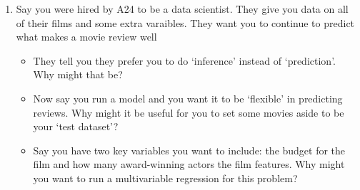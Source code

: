 \documentclass[12pt]{article}
\begin{document}
\begin{enumerate}
  \item Say you were hired by A24 to be a data scientist. They give you data on all of their films and some extra varaibles. They want you to continue to predict what makes a movie review well
  \begin{itemize}
    \item They tell you they prefer you to do `inference' instead of `prediction'. Why might that be?
    
    \item Now say you run a model and you want it to be `flexible' in predicting reviews. Why might it be useful for you to set some movies aside to be your `test dataset'?
    
    \item Say you have two key variables you want to include: the budget for the film and how many award-winning actors the film features. Why might you want to run a multivariable regression for this problem?
  \end{itemize}

\end{enumerate}
\end{document}
